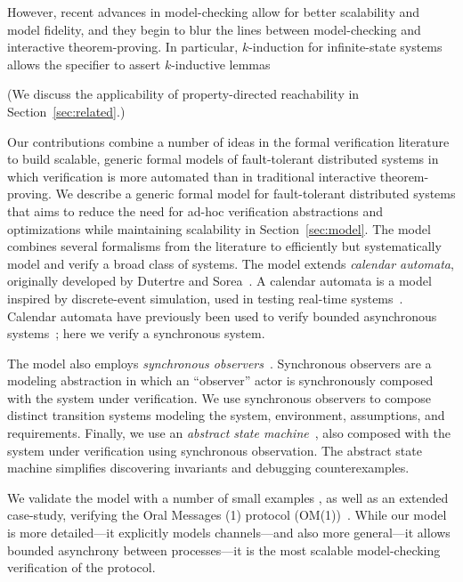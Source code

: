 \documentclass{llncs/llncs}
\newcommand{\lee}[1]{ } %
\newcommand{\lee}[1]{ {\color{blue}$<$lee: #1$>$} } %
\begin{document}
However, recent advances in model-checking allow for better scalability and model fidelity, and they begin to blur the lines between model-checking and interactive theorem-proving. In particular, $k$-induction for infinite-state systems allows the specifier to assert $k$-inductive lemmas 

  (We discuss the applicability of property-directed reachability in Section~\ref{sec:related}.)

Our contributions combine a number of ideas in the formal verification literature to build scalable, generic formal models of fault-tolerant distributed systems in which verification is more automated than in traditional interactive theorem-proving. We describe a generic formal model for fault-tolerant distributed systems that aims to reduce the need for ad-hoc verification abstractions and optimizations while maintaining scalability in Section~\ref{sec:model}. The model combines several formalisms from the literature to efficiently but systematically model and verify a broad class of systems. The model extends \emph{calendar automata}, originally developed by Dutertre and Sorea~\cite{Dutertre-Sorea}. A calendar automata is a model inspired by discrete-event simulation, used in testing real-time systems~\cite{}.  Calendar automata have previously been used to verify bounded asynchronous systems~\cite{}; here we verify a synchronous system.

The model also employs \emph{synchronous observers}~\cite{}. Synchronous observers are a modeling abstraction in which an ``observer'' actor is synchronously composed with the system under verification. We use synchronous observers to compose distinct transition systems modeling the system, environment, assumptions, and requirements. Finally, we use an \emph{abstract state machine}~\cite{}, also composed with the system under verification using synchronous observation. The abstract state machine simplifies discovering invariants and debugging counterexamples.

We validate the model with a number of small examples \lee{todo}, as well as an extended case-study, verifying the Oral Messages (1) protocol (OM(1))~\cite{}. While our model is more detailed---it explicitly models channels---and also more general---it allows bounded asynchrony between processes---it is the most scalable model-checking verification of the protocol.

\lee{finish intro...  One more contribution is that we abstract faults using partially interpreted functions in model-checking, which is new? Note focus is on infinite-state model-checking: will need user-provided lemmas. compositional approach to providing lemmas }
\end{document}
